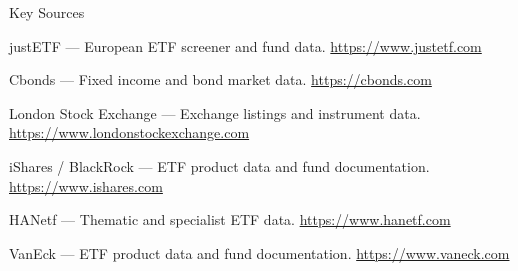 \documentclass[11pt,a4paper]{article}
\begin{document}
\begin{fshfreferences*}{Key Sources}
\item justETF --- European ETF screener and fund data. \url{https://www.justetf.com}
\item Cbonds --- Fixed income and bond market data. \url{https://cbonds.com}
\item London Stock Exchange --- Exchange listings and instrument data. \url{https://www.londonstockexchange.com}
\item iShares / BlackRock --- ETF product data and fund documentation. \url{https://www.ishares.com}
\item HANetf --- Thematic and specialist ETF data. \url{https://www.hanetf.com}
\item VanEck --- ETF product data and fund documentation. \url{https://www.vaneck.com}
\end{fshfreferences*}

\end{document}
